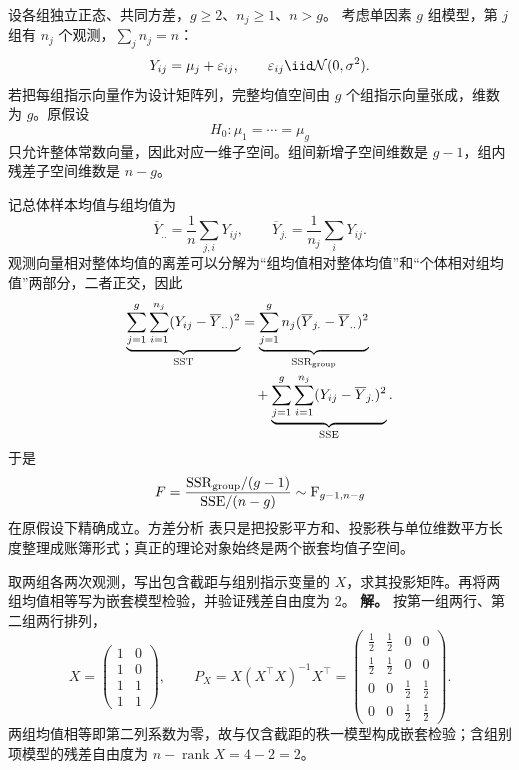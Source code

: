 \begin{proposition}
设各组独立正态、共同方差，$g\ge2$、$n_j\ge1$、$n>g$。
考虑单因素 $g$ 组模型，第 $j$ 组有 $n_j$ 个观测，$\sum_jn_j=n$：
\[
 Y_{ij}=\mu_j+\varepsilon_{ij},
 \qquad
 \varepsilon_{ij}\iid\mathcal N(0,\sigma^2).
\]
若把每组指示向量作为设计矩阵列，完整均值空间由 $g$ 个组指示向量张成，维数为 $g$。原假设
\[
 H_0:\mu_1=\cdots=\mu_g
\]
只允许整体常数向量，因此对应一维子空间。组间新增子空间维数是 $g-1$，组内残差子空间维数是 $n-g$。

记总体样本均值与组均值为
\[
 \overline Y_{..}
 =\frac1n\sum_{j,i}Y_{ij},
 \qquad
 \overline Y_{j.}
 =\frac1{n_j}\sum_iY_{ij}.
\]
观测向量相对整体均值的离差可以分解为“组均值相对整体均值”和“个体相对组均值”两部分，二者正交，因此
\begin{align*}
 \underbrace{\sum_{j=1}^g\sum_{i=1}^{n_j}
 (Y_{ij}-\overline Y_{..})^2}_{\mathrm{SST}}
 &=
 \underbrace{\sum_{j=1}^gn_j
 (\overline Y_{j.}-\overline Y_{..})^2}_{\mathrm{SSR}_{\rm group}}
 \\
 &\quad+
 \underbrace{\sum_{j=1}^g\sum_{i=1}^{n_j}
 (Y_{ij}-\overline Y_{j.})^2}_{\mathrm{SSE}}.
\end{align*}
于是
\begin{equation*}F
 =\frac{\mathrm{SSR}_{\rm group}/(g-1)}{\mathrm{SSE}/(n-g)}
 \sim\mathrm F_{g-1,n-g}
\end{equation*}
在原假设下精确成立。方差分析 表只是把投影平方和、投影秩与单位维数平方长度整理成账簿形式；真正的理论对象始终是两个嵌套均值子空间。
\end{proposition}

\begin{workedexample}[两个组别的实际投影矩阵]
取两组各两次观测，写出包含截距与组别指示变量的 \(X\)，求其投影矩阵。再将两组均值相等写为嵌套模型检验，并验证残差自由度为 \(2\)。
\textbf{解。} 按第一组两行、第二组两行排列，
\[
X=\begin{pmatrix}1&0\\1&0\\1&1\\1&1\end{pmatrix},\qquad
P_X=X(X^\top X)^{-1}X^\top
=\begin{pmatrix}\frac12&\frac12&0&0\\\frac12&\frac12&0&0\\0&0&\frac12&\frac12\\0&0&\frac12&\frac12\end{pmatrix}.
\]
两组均值相等即第二列系数为零，故与仅含截距的秩一模型构成嵌套检验；含组别项模型的残差自由度为 \(n-\operatorname{rank}X=4-2=2\)。
\end{workedexample}

